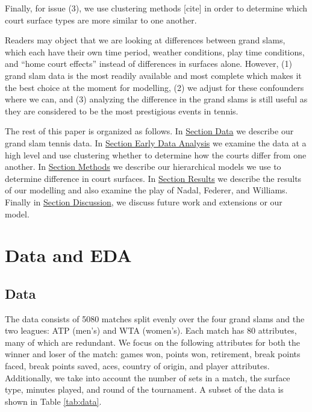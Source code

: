 \documentclass[]{article}
\begin{document}
Finally, for issue (3), we use clustering methods {[}cite{]} in order to
determine which court surface types are more similar to one another.

Readers may object that we are looking at differences between grand
slams, which each have their own time period, weather conditions, play
time conditions, and ``home court effects'' instead of differences in
surfaces alone. However, (1) grand slam data is the most readily
available and most complete which makes it the best choice at the moment
for modelling, (2) we adjust for these confounders where we can, and (3)
analyzing the difference in the grand slams is still useful as they are
considered to be the most prestigious events in tennis.

The rest of this paper is organized as follows. In
\protect\hyperlink{sec:data}{Section Data} we describe our grand slam
tennis data. In \protect\hyperlink{sec:eda}{Section Early Data Analysis}
we examine the data at a high level and use clustering whether to
determine how the courts differ from one another. In
\protect\hyperlink{sec:methods}{Section Methods} we describe our
hierarchical models we use to determine difference in court surfaces. In
\protect\hyperlink{sec:results}{Section Results} we describe the results
of our modelling and also examine the play of Nadal, Federer, and
Williams. Finally in \protect\hyperlink{discussion}{Section Discussion},
we discuss future work and extensions or our model.

\hypertarget{sec:data-eda}{%
\section{Data and EDA}\label{sec:data-eda}}

\hypertarget{sec:data}{%
\subsection{Data}\label{sec:data}}

The data consists of 5080 matches split evenly over the four grand slams
and the two leagues: ATP (men's) and WTA (women's). Each match has 80
attributes, many of which are redundant. We focus on the following
attributes for both the winner and loser of the match: games won, points
won, retirement, break points faced, break points saved, aces, country
of origin, and player attributes. Additionally, we take into account the
number of sets in a match, the surface type, minutes played, and round
of the tournament. A subset of the data is shown in Table
\ref{tab:data}.
\end{document}
